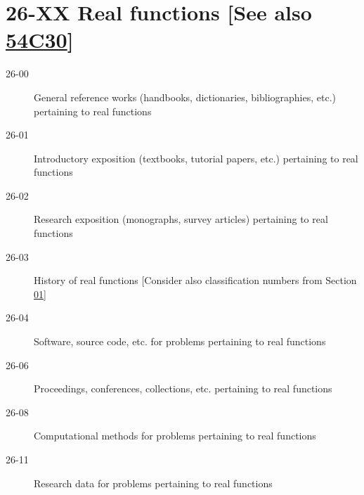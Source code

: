 \section*{26-XX Real functions [See also \hyperref[54C30]{54C30}] }\label{26-XX}
\begin{description}
\item [26-00]\label{26-00} General reference works (handbooks, dictionaries, bibliographies, etc.) pertaining to real functions
\item [26-01]\label{26-01} Introductory exposition (textbooks, tutorial papers, etc.) pertaining to real functions
\item [26-02]\label{26-02} Research exposition (monographs, survey articles) pertaining to real functions
\item [26-03]\label{26-03} History of real functions [Consider also classification numbers from Section \hyperref[01-XX]{01}]
\item [26-04]\label{26-04} Software, source code, etc. for problems pertaining to real functions
\item [26-06]\label{26-06} Proceedings, conferences, collections, etc. pertaining to real functions
\item [26-08]\label{26-08} Computational methods for problems pertaining to real functions
\item [26-11]\label{26-11} Research data for problems pertaining to real functions
\end{description}
